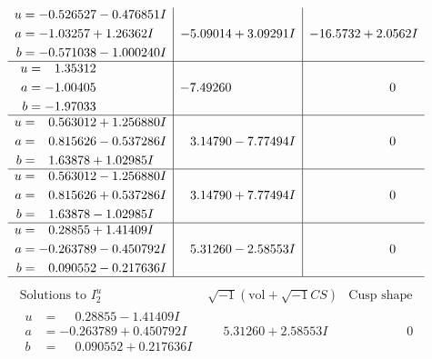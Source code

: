 \documentclass[1p]{elsarticle_modified}
\theoremstyle{definition}
\newcommand{\I}{\sqrt{-1}}
\begin{document}
$$\begin{array}{c|c|c}
\begin{aligned}
u &= -0.526527 - 0.476851 I \\
a &= -1.03257 + 1.26362 I \\
b &= -0.571038 - 1.000240 I\end{aligned}
 & -5.09014 + 3.09291 I & -16.5732 + 2.0562 I \\ \hline\begin{aligned}
u &= \phantom{-}1.35312\phantom{ +0.000000I} \\
a &= -1.00405\phantom{ +0.000000I} \\
b &= -1.97033\phantom{ +0.000000I}\end{aligned}
 & -7.49260\phantom{ +0.000000I} & \phantom{-0.000000 } 0 \\ \hline\begin{aligned}
u &= \phantom{-}0.563012 + 1.256880 I \\
a &= \phantom{-}0.815626 - 0.537286 I \\
b &= \phantom{-}1.63878 + 1.02985 I\end{aligned}
 & \phantom{-}3.14790 - 7.77494 I & \phantom{-0.000000 } 0 \\ \hline\begin{aligned}
u &= \phantom{-}0.563012 - 1.256880 I \\
a &= \phantom{-}0.815626 + 0.537286 I \\
b &= \phantom{-}1.63878 - 1.02985 I\end{aligned}
 & \phantom{-}3.14790 + 7.77494 I & \phantom{-0.000000 } 0 \\ \hline\begin{aligned}
u &= \phantom{-}0.28855 + 1.41409 I \\
a &= -0.263789 - 0.450792 I \\
b &= \phantom{-}0.090552 - 0.217636 I\end{aligned}
 & \phantom{-}5.31260 - 2.58553 I & \phantom{-0.000000 } 0\\
 \hline 
 \end{array}$$\newpage$$\begin{array}{c|c|c}  
\text{Solutions to }I^u_{2}& \I (\text{vol} + \sqrt{-1}CS) & \text{Cusp shape}\\
 \hline 
\begin{aligned}
u &= \phantom{-}0.28855 - 1.41409 I \\
a &= -0.263789 + 0.450792 I \\
b &= \phantom{-}0.090552 + 0.217636 I\end{aligned}
 & \phantom{-}5.31260 + 2.58553 I & \phantom{-0.000000 } 0 \\ \hline\begin{aligned}

\end{aligned}
\end{array}$$
\end{document}
